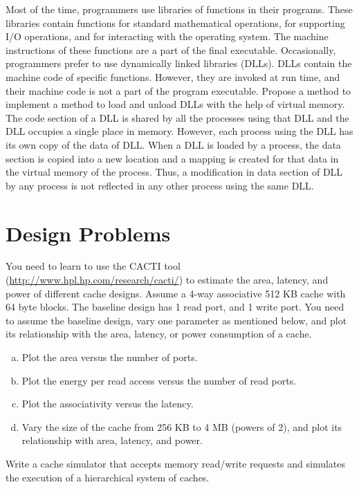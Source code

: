 \begin{ExerciseList}
\Exercise[difficulty=2]
Most of the time, programmers use libraries of functions in their programs. These libraries contain functions
for standard mathematical operations, for supporting I/O operations, and for interacting with the operating system.
The machine instructions of these functions are a part of the final executable. Occasionally, programmers
prefer to use
dynamically linked libraries (DLLs). DLLs contain the machine code of specific functions. However, they are
invoked at run time, and their machine code is not a part of the program executable. Propose a method
to implement a method to load and unload DLLs with the help of virtual memory.
\Answer
The code section of a DLL is shared by all the processes using that DLL and the DLL occupies a single place in memory.
However, each process using the DLL has its own copy of the data of DLL. When a DLL is loaded by a process, the data
section is copied into a new location and a mapping is created for that data in the virtual memory of the process. Thus,
a modification in data section of DLL by any process is not reflected in any other process using the same DLL.

\end{ExerciseList}

\section*{Design Problems}

\begin{ExerciseList}
\Exercise
You need to learn to use the CACTI tool (\url{http://www.hpl.hp.com/research/cacti/}) to estimate the area, latency, and power
of different cache designs. Assume a 4-way associative 512 KB cache with 64 byte blocks.
The baseline design has 1 read port, and 1 write port. You need to assume the baseline design,
vary one parameter as mentioned below, and plot its relationship with the area, latency, or power consumption
of a cache.

\begin{enumerate}[a)]
\item Plot the area versus the number of ports.
\item Plot the energy per read access versus the number of read ports.
\item Plot the associativity versus the latency.
\item Vary the size of the cache from 256 KB to 4 MB (powers of 2), and plot its relationship with
area, latency, and power. 
\end{enumerate}

\Exercise
Write a cache simulator that accepts memory read/write requests and simulates the execution of a hierarchical
system of caches.

\end{ExerciseList}
